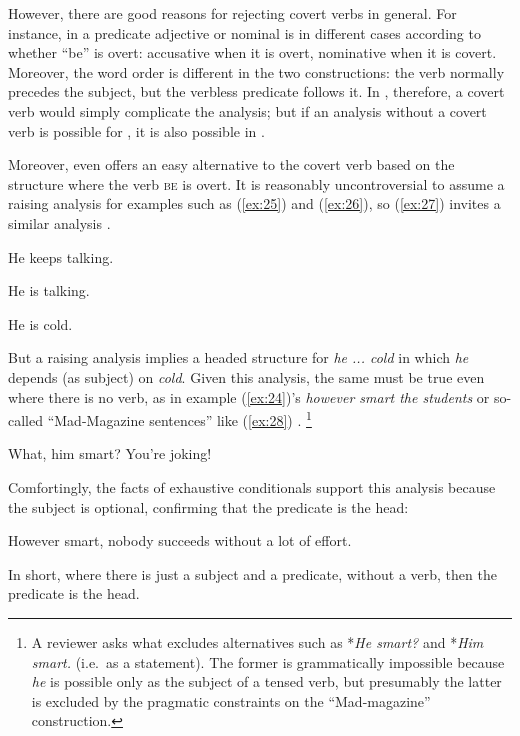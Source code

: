\documentclass[output=paper
 	        ,biblatex
                ,babelshorthands
                ,newtxmath
                ,draftmode
                ,colorlinks, citecolor=brown
]{langscibook}
\begin{document}
However, there are good reasons for rejecting covert verbs in general. For instance, in 
a predicate adjective or nominal is in different cases according to whether ``be'' is overt:
accusative when it is overt, nominative when it is covert. Moreover, the word order is different in
the two constructions: the verb normally precedes the subject, but the verbless predicate follows
it. In , therefore, a covert verb would simply complicate the analysis; but if an
analysis without a covert verb is possible for , it is also possible in .

Moreover, even  offers an easy alternative to the covert verb based on the structure
where the verb \textsc{be} is overt. It is reasonably uncontroversial to assume a raising analysis
for examples such as (\ref{ex:25}) and (\ref{ex:26}), so (\ref{ex:27}) invites a similar analysis
\citep{MuellerPredication,MuellerCopula}.

\eal
\ex \label{ex:25} He keeps talking.

\ex \label{ex:26} He is talking.

\ex \label{ex:27} He is cold.
\zl

\noindent
But a raising analysis implies a headed structure for \emph{he ... cold} in which \emph{he} depends (as subject) on \emph{cold}. Given this analysis, the same must be true even where there is no verb, as in example (\ref{ex:24})'s \emph{however smart the students} or so-called ``Mad-Magazine sentences'' like (\ref{ex:28}) \citep{Lambrecht:90}.%
%
\footnote{A reviewer asks what excludes alternatives such as *\emph{He smart?} and *\emph{Him smart.} (i.e.\ as a statement). The former is grammatically impossible because \emph{he} is possible only as the subject of a tensed verb, but presumably the latter is excluded by the pragmatic constraints on the ``Mad-magazine'' construction.}%
%

\begin{exe}
	\ex \label{ex:28} What, him smart? You're joking!
\end{exe}

\noindent
Comfortingly, the facts of exhaustive conditionals support this analysis because the subject is
optional, confirming that the predicate is the head:

\begin{exe}
	\ex \label{ex:29} However smart, nobody succeeds without a lot of effort.
\end{exe}

\noindent
In short, where there is just a subject and a predicate, without a verb, then the predicate is the
head.
\end{document}
